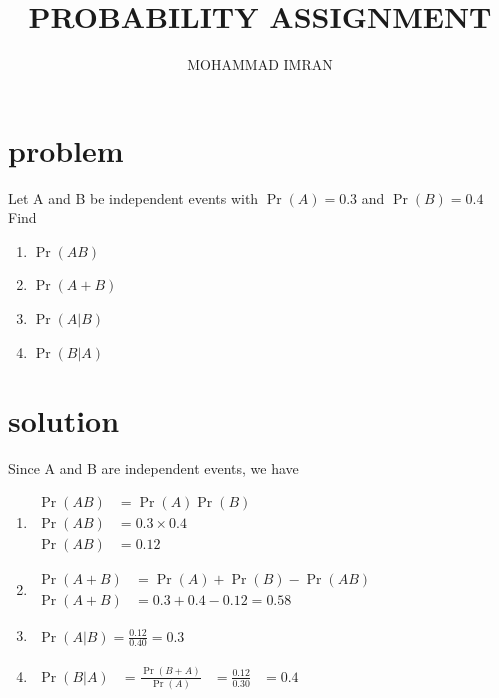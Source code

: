 \documentclass[journal,12pt,twocolumn]{article}
\title{PROBABILITY ASSIGNMENT}
\author{MOHAMMAD IMRAN}
\begin{document}
\maketitle
\bigskip

\section{problem }

Let A and B be independent events with $\Pr{(A)}=0.3$ and $\Pr{(B)}=0.4$ Find 
\begin{enumerate}

\item$\Pr{(AB)}$
\item$\Pr{(A+B)}$ 
\item$\Pr{(A | B)}$   
\item$\Pr{(B | A)}$
       \end{enumerate}
\section{solution }  


Since A and B are independent events, we have 

\begin{enumerate}

\item $\begin{aligned}
 \Pr{(AB)}&=\Pr{(A)} \Pr{(B)}&\\
\Pr{(AB)}&=0.3 \times 0.4&\\
\Pr{(AB)}&=0.12&
\end{aligned}$


\item $\begin{aligned}
\Pr{(A+B)}&=\Pr{(A)}+\Pr{(B)}-\Pr{(AB)}&\\
\Pr{(A+B)}&=0.3+0.4-0.12=0.58&
\end{aligned}$


\item $\begin{aligned}
\Pr{(A | B)}=\frac{0.12}{0.40}=0.3
\end{aligned}$
\item $\begin{aligned}
\Pr{(B | A)}&=\frac{\Pr{(B+A)}}{\Pr{(A)}}&=\frac{0.12}{0.30}&=0.4&
\end{aligned}$
\end{enumerate}
\end{document}
